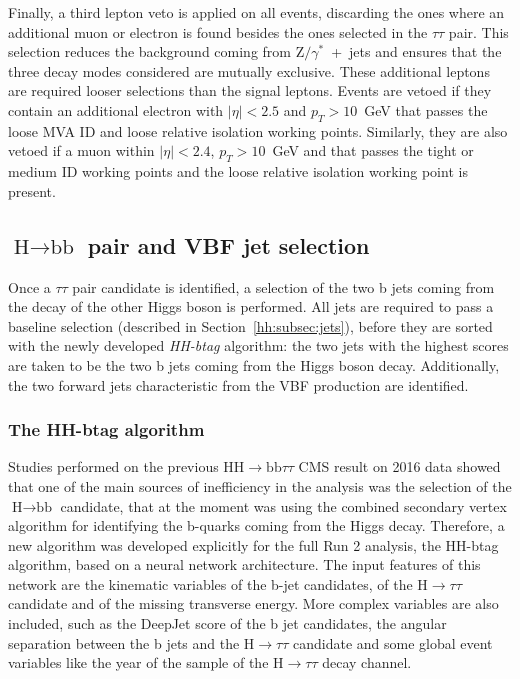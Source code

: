 \documentclass[../main.tex]{subfiles}
\begin{document}
Finally, a third lepton veto is applied on all events, discarding the ones where an additional muon or electron is found besides the ones selected in the $\tau\tau$ pair. This selection reduces the background coming from Z$/\gamma^*$~+~jets and ensures that the three \tauh\tauh{} decay modes considered are mutually exclusive. These additional leptons are required looser selections than the signal leptons. Events are vetoed if they contain an additional electron with $|\eta|<2.5$ and $p_T>10$~GeV that passes the loose MVA ID and loose relative isolation working points. Similarly, they are also vetoed if a muon within $|\eta| < 2.4$, $p_T > 10$~GeV and that passes the tight or medium ID working points and the loose relative isolation working point is present.


\subsection{$\text{H}\to\text{bb}$ pair and VBF jet selection}
\label{hh:sec:hbb}

Once a $\tau\tau$ pair candidate is identified, a selection of the two b jets coming from the decay of the other Higgs boson is performed. All jets are required to pass a baseline selection (described in Section~\ref{hh:subsec:jets}), before they are sorted with the newly developed \textit{HH-btag} algorithm: the two jets with the highest scores are taken to be the two b jets coming from the Higgs boson decay. Additionally, the two forward jets characteristic from the VBF production are identified. 

\subsubsection{The HH-btag algorithm}

Studies performed on the previous $\text{HH}\to\text{bb}\tau\tau$ CMS result on 2016 data \cite{hh:analysis:2016} showed that one of the main sources of inefficiency in the analysis was the selection of the $\text{H}\to\text{bb}$ candidate, that at the moment was using the combined secondary vertex \cite{hh:analysis:sv} algorithm for identifying the b-quarks coming from the Higgs decay. Therefore, a new algorithm was developed explicitly for the full Run 2 analysis, the HH-btag algorithm, based on a neural network architecture. The input features of this network are the kinematic variables of the b-jet candidates, of the $\text{H}\to\tau\tau$ candidate and of the missing transverse energy. More complex variables are also included, such as the DeepJet score of the b jet candidates, the angular separation between the b jets and the $\text{H}\to\tau\tau$ candidate and some global event variables like the year of the sample of the $\text{H}\to\tau\tau$ decay channel.
\end{document}
